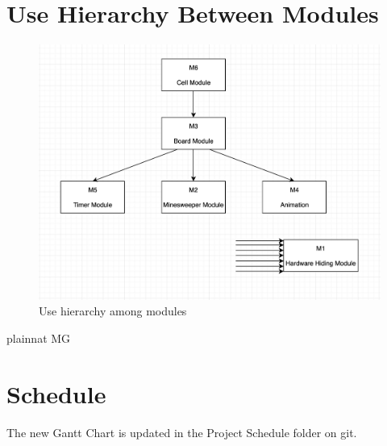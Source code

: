 \documentclass[12pt, titlepage]{article}
\begin{document}
\section{Use Hierarchy Between Modules} \label{SecUse}


\begin{figure}[H]
\centering
\includegraphics[width=1.0\textwidth]{userh.png}
\caption{Use hierarchy among modules}
\label{FigUH}
\end{figure}


 {plainnat}
 {MG}

\section{Schedule}
The new Gantt Chart is updated in the Project Schedule folder on git.
\end{document}
